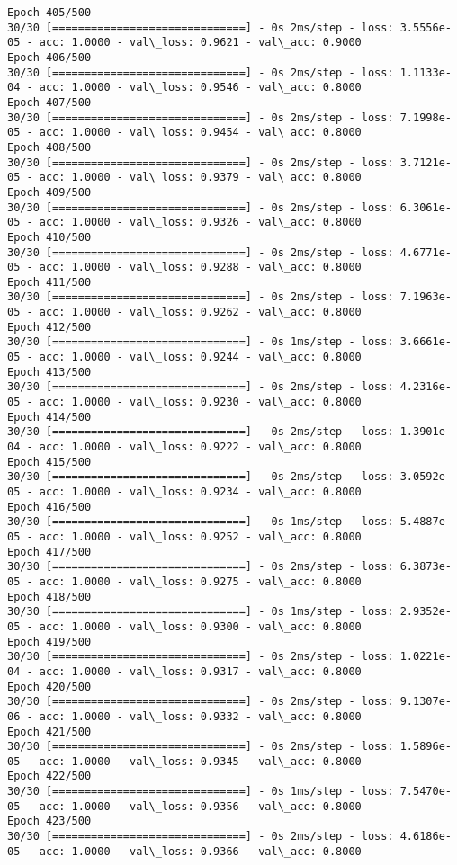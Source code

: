 \documentclass[11pt]{article}
\begin{document}
\begin{Verbatim}[commandchars=\\\{\}]
Epoch 405/500
30/30 [==============================] - 0s 2ms/step - loss: 3.5556e-05 - acc: 1.0000 - val\_loss: 0.9621 - val\_acc: 0.9000
Epoch 406/500
30/30 [==============================] - 0s 2ms/step - loss: 1.1133e-04 - acc: 1.0000 - val\_loss: 0.9546 - val\_acc: 0.8000
Epoch 407/500
30/30 [==============================] - 0s 2ms/step - loss: 7.1998e-05 - acc: 1.0000 - val\_loss: 0.9454 - val\_acc: 0.8000
Epoch 408/500
30/30 [==============================] - 0s 2ms/step - loss: 3.7121e-05 - acc: 1.0000 - val\_loss: 0.9379 - val\_acc: 0.8000
Epoch 409/500
30/30 [==============================] - 0s 2ms/step - loss: 6.3061e-05 - acc: 1.0000 - val\_loss: 0.9326 - val\_acc: 0.8000
Epoch 410/500
30/30 [==============================] - 0s 2ms/step - loss: 4.6771e-05 - acc: 1.0000 - val\_loss: 0.9288 - val\_acc: 0.8000
Epoch 411/500
30/30 [==============================] - 0s 2ms/step - loss: 7.1963e-05 - acc: 1.0000 - val\_loss: 0.9262 - val\_acc: 0.8000
Epoch 412/500
30/30 [==============================] - 0s 1ms/step - loss: 3.6661e-05 - acc: 1.0000 - val\_loss: 0.9244 - val\_acc: 0.8000
Epoch 413/500
30/30 [==============================] - 0s 2ms/step - loss: 4.2316e-05 - acc: 1.0000 - val\_loss: 0.9230 - val\_acc: 0.8000
Epoch 414/500
30/30 [==============================] - 0s 2ms/step - loss: 1.3901e-04 - acc: 1.0000 - val\_loss: 0.9222 - val\_acc: 0.8000
Epoch 415/500
30/30 [==============================] - 0s 2ms/step - loss: 3.0592e-05 - acc: 1.0000 - val\_loss: 0.9234 - val\_acc: 0.8000
Epoch 416/500
30/30 [==============================] - 0s 1ms/step - loss: 5.4887e-05 - acc: 1.0000 - val\_loss: 0.9252 - val\_acc: 0.8000
Epoch 417/500
30/30 [==============================] - 0s 2ms/step - loss: 6.3873e-05 - acc: 1.0000 - val\_loss: 0.9275 - val\_acc: 0.8000
Epoch 418/500
30/30 [==============================] - 0s 1ms/step - loss: 2.9352e-05 - acc: 1.0000 - val\_loss: 0.9300 - val\_acc: 0.8000
Epoch 419/500
30/30 [==============================] - 0s 2ms/step - loss: 1.0221e-04 - acc: 1.0000 - val\_loss: 0.9317 - val\_acc: 0.8000
Epoch 420/500
30/30 [==============================] - 0s 2ms/step - loss: 9.1307e-06 - acc: 1.0000 - val\_loss: 0.9332 - val\_acc: 0.8000
Epoch 421/500
30/30 [==============================] - 0s 2ms/step - loss: 1.5896e-05 - acc: 1.0000 - val\_loss: 0.9345 - val\_acc: 0.8000
Epoch 422/500
30/30 [==============================] - 0s 1ms/step - loss: 7.5470e-05 - acc: 1.0000 - val\_loss: 0.9356 - val\_acc: 0.8000
Epoch 423/500
30/30 [==============================] - 0s 2ms/step - loss: 4.6186e-05 - acc: 1.0000 - val\_loss: 0.9366 - val\_acc: 0.8000

\end{Verbatim}
\end{document}
